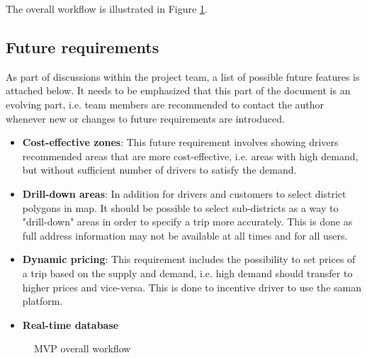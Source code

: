\noindent The overall workflow is illustrated in Figure \ref{fig:overall_flow}.

\subsection{Future requirements}
\label{subsec:future_req}

\noindent As part of discussions within the project team, a list of possible future features is attached below. It needs to be emphasized that this part of the document is an evolving part, i.e. team members are recommended to contact the author whenever new or changes to future requirements are introduced.
\begin{itemize}
    \item \textbf{Cost-effective zones}: This future requirement involves showing drivers recommended areas that are more cost-effective, i.e. areas with high demand, but without sufficient number of drivers to satisfy the demand.
    \item \textbf{Drill-down areas}: In addition for drivers and customers to select district polygons in map. It should be possible to select sub-districts as a way to "drill-down" areas in order to specify a trip more accurately. This is done as full address information may not be available at all times and for all users.
    \item \textbf{Dynamic pricing}: This requirement includes the possibility to set prices of a trip based on the supply and demand, i.e. high demand should transfer to higher prices and vice-versa. This is done to incentive driver to use the saman platform.
    \item \textbf{Real-time database}
\end{itemize}

\begin{figure}
    
\caption{MVP overall workflow}
\label{fig:overall_flow}
\end{figure}
